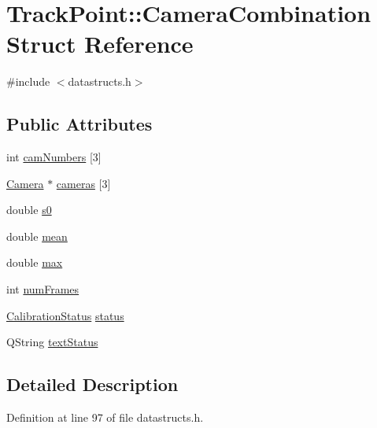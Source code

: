 \hypertarget{struct_track_point_1_1_camera_combination}{}\section{Track\+Point\+::Camera\+Combination Struct Reference}
\label{struct_track_point_1_1_camera_combination}


{\ttfamily \#include $<$datastructs.\+h$>$}

\subsection*{Public Attributes}
\begin{DoxyCompactItemize}
\item 
int \mbox{\hyperlink{struct_track_point_1_1_camera_combination_a370eba794317088bb5bda2e0110d483c}{cam\+Numbers}} \mbox{[}3\mbox{]}
\item 
\mbox{\hyperlink{struct_track_point_1_1_camera}{Camera}} $\ast$ \mbox{\hyperlink{struct_track_point_1_1_camera_combination_a5e408335a468f462cff39df3f55c1bf2}{cameras}} \mbox{[}3\mbox{]}
\item 
double \mbox{\hyperlink{struct_track_point_1_1_camera_combination_a200bfc9ddb61d1da855982cc17df4c4e}{s0}}
\item 
double \mbox{\hyperlink{struct_track_point_1_1_camera_combination_a36c1bce2462deef818b58289058f1e58}{mean}}
\item 
double \mbox{\hyperlink{struct_track_point_1_1_camera_combination_aa4875b6617090104e1e64ac1d9627f12}{max}}
\item 
int \mbox{\hyperlink{struct_track_point_1_1_camera_combination_a9779d5742a2af64791d13f753c568324}{num\+Frames}}
\item 
\mbox{\hyperlink{namespace_track_point_acb9b2c2551da82b4cf9faf18d09335cd}{Calibration\+Status}} \mbox{\hyperlink{struct_track_point_1_1_camera_combination_a69b78062d3ccff207918cf72943638fb}{status}}
\item 
Q\+String \mbox{\hyperlink{struct_track_point_1_1_camera_combination_a33828548734f5e065d6ebacff3416bd2}{text\+Status}}
\end{DoxyCompactItemize}


\subsection{Detailed Description}


Definition at line 97 of file datastructs.\+h.



